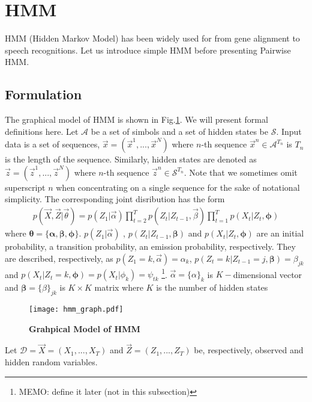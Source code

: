 %
%
\section{HMM}
HMM (Hidden Markov Model) has been widely used for from gene alignment to speech recognitions. Let us introduce simple HMM before presenting Pairwise HMM.

\subsection{Formulation}
The graphical model of HMM is shown in Fig.\ref{fig:hmm_graph}. We will present formal definitions here.
Let $\mathcal{A}$ be a set of simbols and a set of hidden states be $\mathcal{S}$.
Input data is a set of sequences, $\vec{x} = (\vec{x}^1, ..., \vec{x}^{N})$ where $n$-th sequence $\vec{x}^n \in \mathcal{A}^{T_n}$ is $T_n$ is the length of the sequence.
Similarly, hidden states are denoted as $\vec{z} = (\vec{z}^1, ..., \vec{z}^{N})$ where $n$-th sequence $\vec{z}^n \in \mathcal{S}^{T_n}$. Note that we sometimes omit superscript $n$ when concentrating on a single sequence for the sake of notational simplicity.
The corresponding joint disribution has the form
\begin{eqnarray}
  p(\vec{X}, \vec{Z} | \vec{\theta}) = p(Z_1 | \vec{\alpha}) \prod_{t=2}^T p(Z_t|Z_{t-1}, \vec{\beta}) \prod_{t=1}^T p(X_t | Z_t, \mathbf{\phi})
\end{eqnarray}
where $\mathbf{\theta} = \{\mathbf{\alpha}, \mathbf{\beta}, \mathbf{\phi} \}$. $p(Z_1| \vec{\alpha})$ , $p(Z_t|Z_{t-1}, \mathbf{\beta})$ and $p(X_t|Z_t, \mathbf{\phi})$ are an initial probability, a transition probability, an emission probability, respectively.
They are described, respectively, as $p(Z_1 = k, \vec{\alpha}) = \alpha_k$, $p(Z_t = k|Z_{t-1}=j, \mathbf{\beta}) = \beta_{jk}$ and $p(X_t|Z_t = k, \mathbf{\phi}) = p(X_t|\phi_k) = \psi_{tk}$ \footnote{MEMO: define it later (not in this subsection)}. 
$\vec{\alpha} = \{\alpha\}_k$ is $K-$dimensional vector and $\mathbf{\beta} = \{\beta\}_{jk}$ is $K \times K$ matrix where $K$ is the number of hidden states

\begin{figure}
  \centering
  \texttt{[image: hmm\_graph.pdf]}
  \caption{{\bf Grahpical Model of HMM}}
  \label{fig:hmm_graph}
\end{figure}Let $\mathcal{D}=\vec{X} = (X_1, ..., X_T)$ and $\vec{Z} = (Z_1, ..., Z_T)$ be, respectively, observed and hidden random variables. 


